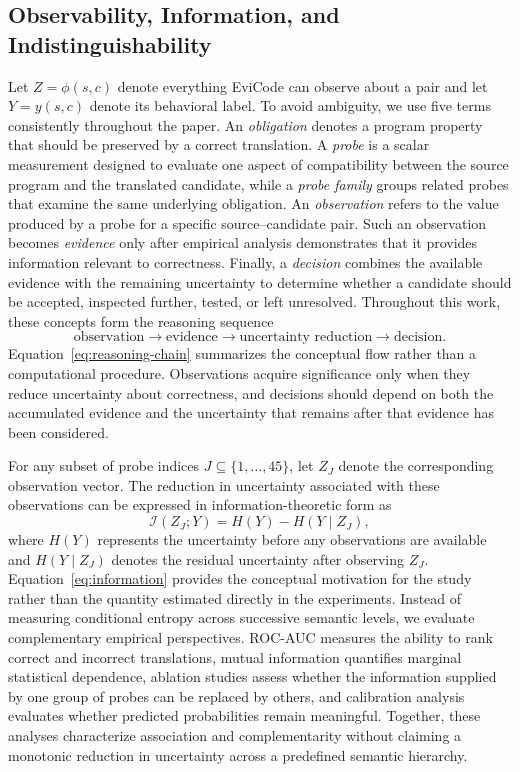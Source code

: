 \documentclass[conference]{IEEEtran}
\begin{document}
\subsection{Observability, Information, and Indistinguishability}
Let $Z=\phi(s,c)$ denote everything EviCode can observe about a pair and let $Y=y(s,c)$ denote its behavioral label. To avoid ambiguity, we use five terms consistently throughout the paper. An \emph{obligation} denotes a program property that should be preserved by a correct translation. A \emph{probe} is a scalar measurement designed to evaluate one aspect of compatibility between the source program and the translated candidate, while a \emph{probe family} groups related probes that examine the same underlying obligation. An \emph{observation} refers to the value produced by a probe for a specific source--candidate pair. Such an observation becomes \emph{evidence} only after empirical analysis demonstrates that it provides information relevant to correctness. Finally, a \emph{decision} combines the available evidence with the remaining uncertainty to determine whether a candidate should be accepted, inspected further, tested, or left unresolved. Throughout this work, these concepts form the reasoning sequence
\begin{equation}
\text{observation}\rightarrow\text{evidence}\rightarrow
\text{uncertainty reduction}\rightarrow\text{decision}.
\label{eq:reasoning-chain}
\end{equation}
Equation~\ref{eq:reasoning-chain} summarizes the conceptual flow rather than a computational procedure. Observations acquire significance only when they reduce uncertainty about correctness, and decisions should depend on both the accumulated evidence and the uncertainty that remains after that evidence has been considered.

For any subset of probe indices $J\subseteq\{1,\ldots,45\}$, let $Z_J$ denote the corresponding observation vector. The reduction in uncertainty associated with these observations can be expressed in information-theoretic form as
\begin{equation}
\mathcal{I}(Z_J;Y)=H(Y)-H(Y\mid Z_J),
\label{eq:information}
\end{equation}
where $H(Y)$ represents the uncertainty before any observations are available and $H(Y\mid Z_J)$ denotes the residual uncertainty after observing $Z_J$. Equation~\ref{eq:information} provides the conceptual motivation for the study rather than the quantity estimated directly in the experiments. Instead of measuring conditional entropy across successive semantic levels, we evaluate complementary empirical perspectives. ROC-AUC measures the ability to rank correct and incorrect translations, mutual information quantifies marginal statistical dependence, ablation studies assess whether the information supplied by one group of probes can be replaced by others, and calibration analysis evaluates whether predicted probabilities remain meaningful. Together, these analyses characterize association and complementarity without claiming a monotonic reduction in uncertainty across a predefined semantic hierarchy.
\end{document}
